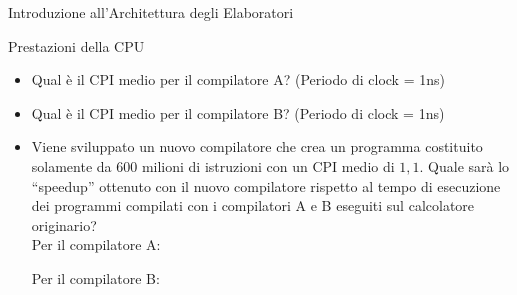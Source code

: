 \documentclass[11pt]{article}
\begin{document}
\begin{quiz}{Introduzione all'Architettura degli Elaboratori}
\begin{cloze}[points=1,shuffle=false]{Prestazioni della CPU}
\begin{itemize}
    \item Qual è il CPI medio per il compilatore A? (Periodo di clock = 1ns)
    \item Qual è il CPI medio per il compilatore B? (Periodo di clock = 1ns) 
    \item Viene sviluppato un nuovo compilatore che crea un programma costituito solamente da 600 milioni di istruzioni con un CPI medio di $1,1$. Quale sarà lo ``speedup'' ottenuto con il nuovo compilatore rispetto al tempo di esecuzione dei programmi compilati con i compilatori A e B eseguiti sul calcolatore originario?\\
    Per il compilatore A: 
    Per il compilatore B: 
\end{itemize}
\end{cloze}


\end{quiz}
\end{document}
